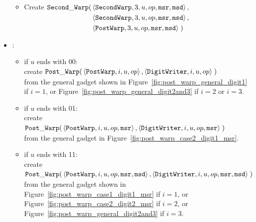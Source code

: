 \begin{itemize}
\begin{itemize}
        \item Create
        $\begin{aligned}[t]
            {\tt Second\_Warp}(& \left\langle {\tt SecondWarp}, 3, u, op, {\tt msr}, {\tt msd} \right\rangle, \\
                        & \left\langle {\tt SecondWarp}, 3, u, op, {\tt msr}, {\tt msd} \right\rangle, \\
                        & \left\langle {\tt PostWarp},   3, u, op, {\tt msr}, {\tt msd} \right\rangle \;)
        \end{aligned}$
        \end{itemize}

        \item {\postwarp}:
        \begin{itemize}
           \item if $u$ ends with 00:\\
            create
            $\begin{aligned}[t]
                {\tt Post\_Warp}(& \left \langle {\tt PostWarp},  i, u,   op \right\rangle,
                            \left \langle {\tt DigitWriter}, i, u, op \right\rangle \;)
            \end{aligned}$ \\
            from the general gadget shown in Figure~\ref{fig:post_warp_general_digit1} if $i = 1$,
            or Figure~\ref{fig:post_warp_general_digit2and3} if $ i = 2$ or $i = 3$.
            \vspace{.5cm}

            \item if $u$ ends with 01:\\
            create
            $\begin{aligned}[t]
                {\tt Post\_Warp}(& \left \langle {\tt PostWarp},    i, u, op, {\tt msr} \right\rangle,
                            \left \langle {\tt DigitWriter}, i, u, op, {\tt msr} \right\rangle \;)
            \end{aligned}$ \\
            from the general gadget in Figure~\ref{fig:post_warp_case2_digit1_msr}.
            \vspace{.5cm}

            \item if $u$ ends with 11:\\
            create
            $\begin{aligned}[t]
                {\tt Post\_Warp}(& \left \langle {\tt PostWarp},    i, u, op, {\tt msr}, {\tt msd} \right\rangle,
                            \left \langle {\tt DigitWriter}, i, u, op, {\tt msr}, {\tt msd} \right\rangle \;)
            \end{aligned}$ \\
            from the general gadget shown in Figure~\ref{fig:post_warp_case1_digit1_msr} if $i = 1$, or
            Figure~\ref{fig:post_warp_case2_digit2_msr} if $i = 2$, or Figure~\ref{fig:post_warp_general_digit2and3} if $i = 3$.
            \vspace{.5cm}


\end{itemize}
\end{itemize}
